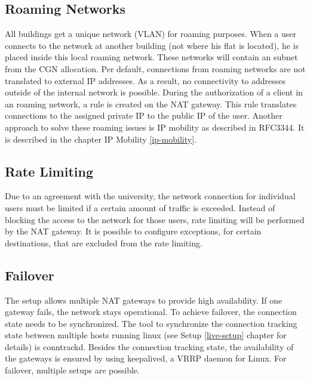 \documentclass{report}
\begin{document}
\subsection{Roaming Networks}\label{roaming-networks}

All buildings get a unique network (VLAN) for roaming purposes. When a user connects to the network
at another building (not where his flat is located), he is placed inside
this local roaming network. These networks will contain an subnet from
the CGN allocation. Per default, connections from roaming networks are
not translated to external IP addresses. As a result, no connectivity to
addresses outside of the internal network is possible. During the
authorization of a client in an roaming network, a rule is created on
the NAT gateway. This rule translates connections to the assigned
private IP to the public IP of the user. Another approach to solve these
roaming issues is IP mobility as described in RFC3344\cite{IPMob}. It is described in the chapter IP Mobility \ref{ip-mobility}.



\subsection{Rate Limiting}\label{rate-limiting}

Due to an agreement with the university, the network connection for
individual users must be limited if a certain amount of traffic is
exceeded. Instead of blocking the access to the network for those users,
rate limiting will be performed by the NAT gateway. It is possible to 
configure exceptions, for certain destinations, that are excluded from the rate limiting.


\subsection{Failover}\label{failover}

The setup allows multiple NAT gateways to provide high availability. If one
gateway fails, the network stays operational. To achieve failover,
the connection state needs to be synchronized. The tool to synchronize
the connection tracking state between multiple hosts running linux (see Setup \ref{live-setup} chapter for details) is
conntrackd\cite{conntrack-tools}. Besides the connection tracking state, the availability
of the gateways is ensured by using keepalived\cite{keepalived}, a VRRP daemon for Linux.
For failover, multiple setups are possible.
\end{document}
